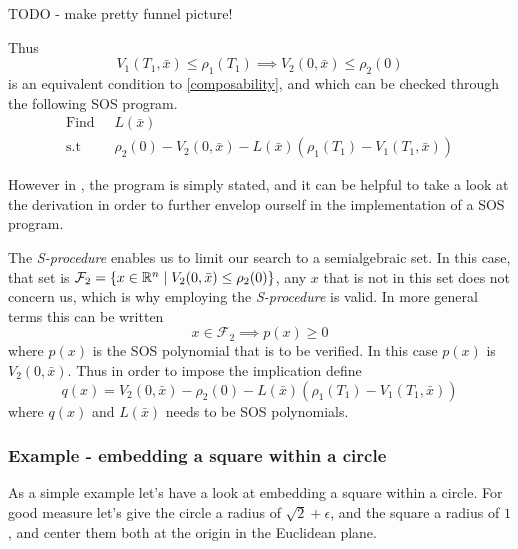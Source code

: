 TODO - make pretty funnel picture!

Thus
\[
  V_1(T_1,\bar{x}) \leq \rho_1(T_1) \implies V_2(0,\bar{x}) \leq \rho_2(0)
\]
is an equivalent condition to \ref{composability}, and which can be checked
through the following \ac{SOS} program.
\begin{align*}
  \text{Find } \; &L(\bar{x}) \\
  \text{s.t} \; &\rho_2(0) - V_2(0,\bar{x}) - L(\bar{x})
                  \left( \rho_1(T_1) - V_1(T_1,\bar{x}) \right)
\end{align*}
\cite[Majumdar and Tedrake, p.~54]{majumdarFunnelLibrariesRealtime2017}

However in \cite[Majumdar and Tedrake]{majumdarFunnelLibrariesRealtime2017}, the
program is simply stated, and it can be helpful to take a look at the derivation
in order to further envelop ourself in the implementation of a \ac{SOS} program.

The \textit{S-procedure} enables us to limit our search to a semialgebraic set.
In this case, that set is \(\mathcal{F}_2 = \lbrace x \in \mathbb{R}^n \mid V_2(0,\bar{x})
  \leq \rho_2(0)\rbrace\), any \(x\) that is not in this set does not concern us,
which is why employing the \textit{S-procedure} is valid. In more general terms
this can be written
\[
  x \in \mathcal{F}_2 \implies p(x) \geq 0
\]
where \(p(x)\) is the \ac{SOS} polynomial that is to be verified. In this case
\(p(x)\) is \(V_2(0,\bar{x})\). Thus in order to impose the implication define
\[
  q(x) = V_2(0,\bar{x}) - \rho_2(0) - L(\bar{x}) \left( \rho_1(T_1) -
    V_1(T_1,\bar{x}) \right)
\]
where \(q(x)\) and \(L(\bar{x})\) needs to be SOS polynomials.

\subsubsection{Example - embedding a square within a circle}

As a simple example let's have a look at embedding a square within a circle. For
good measure let's give the circle a radius of \(\sqrt{2}+\epsilon\), and the
square a radius of \(1\), and center them both at the origin in the Euclidean
plane.

